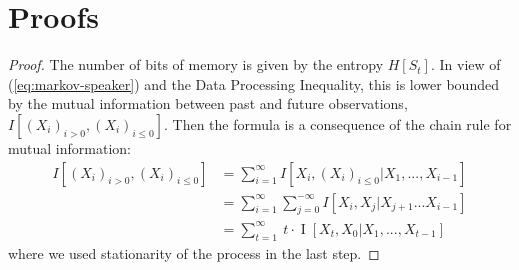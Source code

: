 \documentclass[11pt,letterpaper]{article}
\begin{document}
\section{Proofs}



\begin{proof}
	The number of bits of memory is given by the entropy $H[S_t]$.
	In view of (\ref{eq:markov-speaker}) and the Data Processing Inequality, this is lower bounded by the mutual information between past and future observations, $I[(X_i)_{i>0}, (X_i)_{i \leq 0}]$. 
Then the formula is a consequence of the chain rule for mutual information:
\begin{align*}
	I[(X_i)_{i > 0}, (X_i)_{i \leq 0}] &= \sum_{i=1}^\infty I[X_i, (X_i)_{i \leq 0}|X_1, ..., X_{i-1}] \\
	&= \sum_{i=1}^\infty \sum_{j=0}^{-\infty} I[X_i, X_j|X_{j+1}...X_{i-1}] \\
& = \sum_{t=1}^\infty\ t \cdot \operatorname{I}[X_t, X_0 | X_1, ..., X_{t-1}]
\end{align*}
where we used stationarity of the process in the last step.
\end{proof}
\end{document}
